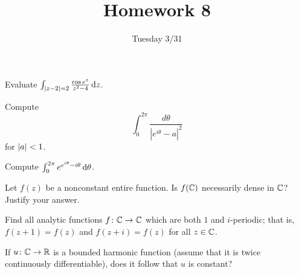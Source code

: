 \documentclass{../math135}
\title{Homework 8}
\author{}
\date{Tuesday 3/31}
\begin{document}
\begin{exercise}
	Evaluate \(\int_{\lvert z-2\rvert=2} \frac{\cos e^z}{z^2-4} \mathop{}\!\mathrm d z\).

  \begin{solution}

  \end{solution}
\end{exercise}

\begin{exercise}
	Compute
  \[
		\int_0^{2\pi} \frac{ d\theta }{|e^{i\theta}-a|^2}
  \]
	for \(\lvert a\rvert < 1\).

  \begin{solution}

  \end{solution}
\end{exercise}

\begin{exercise}
	Compute \(\int_0^{2\pi} e^{e^{i\theta}-i\theta} \mathop{}\!\mathrm d\theta\).

  \begin{solution}

  \end{solution}
\end{exercise}

\begin{exercise}
	Let \(f(z)\) be a nonconstant entire function.  Is \(f(\mathbb C)\)
  necessarily dense in \(\mathbb C\)?  Justify your answer.

  \begin{solution}

  \end{solution}
\end{exercise}

\begin{exercise}
	Find all analytic functions \(f \colon \mathbb C \to \mathbb C\) which are both
  \(1\) and \(i\)-periodic; that is, \(f(z+1) = f(z)\) and
  \(f(z+i) = f(z)\) for all \(z \in \mathbb C\).

  \begin{solution}

  \end{solution}
\end{exercise}

\begin{exercise}
	If \(u \colon \mathbb C \to \mathbb R\) is a bounded harmonic function (assume
  that it is twice continuously differentiable), does it follow that
  \(u\) is constant?

  \begin{solution}

  \end{solution}
\end{exercise}
\end{document}
